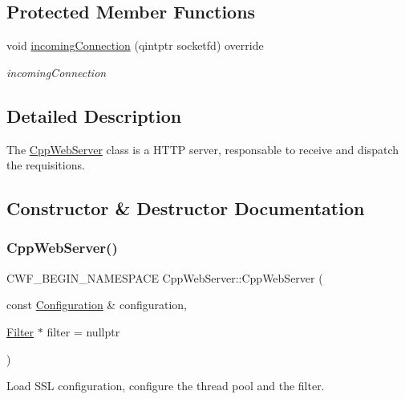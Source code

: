 \subsection*{Protected Member Functions}
\begin{DoxyCompactItemize}
\item 
void \hyperlink{class_cpp_web_server_a49addc6ee3148d11134062e6b7a56791}{incoming\+Connection} (qintptr socketfd) override
\begin{DoxyCompactList}\small\item\em incoming\+Connection \end{DoxyCompactList}\end{DoxyCompactItemize}


\subsection{Detailed Description}
The \hyperlink{class_cpp_web_server}{Cpp\+Web\+Server} class is a H\+T\+TP server, responsable to receive and dispatch the requisitions. 

\subsection{Constructor \& Destructor Documentation}
\mbox{\label{class_cpp_web_server_a9c5598c541de45a40d2ebad698e9a616}} 
\subsubsection{\texorpdfstring{Cpp\+Web\+Server()}{CppWebServer()}}
{\footnotesize\ttfamily C\+W\+F\+\_\+\+B\+E\+G\+I\+N\+\_\+\+N\+A\+M\+E\+S\+P\+A\+CE Cpp\+Web\+Server\+::\+Cpp\+Web\+Server (\begin{DoxyParamCaption}\item[{const \hyperlink{class_configuration}{Configuration} \&}]{configuration,  }\item[{\hyperlink{class_filter}{Filter} $\ast$}]{filter = {\ttfamily nullptr} }\end{DoxyParamCaption})\hspace{0.3cm}{\ttfamily [explicit]}}



Load S\+SL configuration, configure the thread pool and the filter. 


